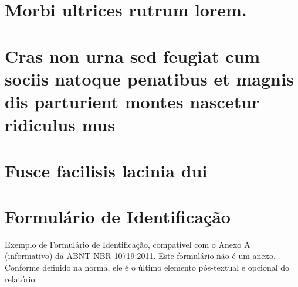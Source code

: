 \documentclass[12pt,openright,twoside,a4paper,english,french,spanish,brazil]{abntex2}
\begin{document}
\begin{anexosenv}

\partanexos

\chapter{Morbi ultrices rutrum lorem.}
\lipsum[30]

\chapter{Cras non urna sed feugiat cum sociis natoque penatibus et magnis dis
parturient montes nascetur ridiculus mus}

\lipsum[31]

\chapter{Fusce facilisis lacinia dui}

\lipsum[32]

\end{anexosenv}


\printindex

\chapter*[Formulário de Identificação]{Formulário de Identificação}
\label{formulado-identificacao}

Exemplo de Formulário de Identificação, compatível com o Anexo A (informativo)
da ABNT NBR 10719:2011. Este formulário não é um anexo. Conforme definido na
norma, ele é o último elemento pós-textual e opcional do relatório.

\bigskip
\end{document}

